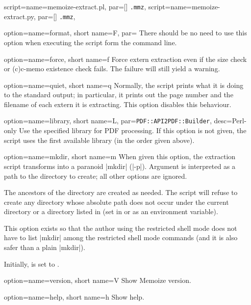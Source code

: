\documentclass[a4paper,11pt]{article}
\begin{document}
\begin{doc}{
    script={name=memoize-extract.pl, par=[] \texttt{.mmz}},
    script={name=memoize-extract.py, par=[] \texttt{.mmz}},
  }
\begin{doc}{
      option={name=format, short name=F,
        par=\Alt{}\Alt{}}
    }
    There should be no need to use this option when executing the script form
    the command line.
  \end{doc}
  \begin{doc}{
      option={name=force, short name=f}
    }
    Force extern extraction even if the size check or (c)c-memo existence check
    fails.  The failure will still yield a warning.
  \end{doc}
  \begin{doc}{
      option={name=quiet, short name=q}
    }
    Normally, the script prints what it is doing to the standard output; in
    particular, it prints out the page number and the filename of each extern
    it is extracting.  This option disables this behaviour.
  \end{doc}
  \begin{doc}{
    option={name=library, short name=L,
      par=\texttt{PDF::API2\Alt PDF::Builder}, desc=Perl-only}
  }
  Use the specified library for PDF processing.  If this option is not given,
  the script uses the first available library (in the order given above).
  \end{doc}
  \begin{doc}{
      option={name=mkdir, short name=m}
    }
    When given this option, the extraction script transforms into a paranoid
    |mkdir| (|-p|).  Argument \dmmz is interpreted as a path to the
    directory to create; all other options are ignored.

    The ancestors of the directory are created as needed.  The script will
    refuse to create any directory whose absolute path does not occur under the
    current directory or a directory listed in  (set in
     or as an environment variable).

    This option exists so that the author using the restricted shell mode does
    not have to list |mkdir| among the restricted shell mode commands (and it
    is also safer than a plain |mkdir|).

    Initially,  is set to
    .
  \end{doc}
  \begin{doc}{
      option={name=version, short name=V}
    }
    Show Memoize version.
  \end{doc}
  \begin{doc}{
      option={name=help, short name=h}
    }
    Show help.
  \end{doc}


\end{doc}
\end{document}

